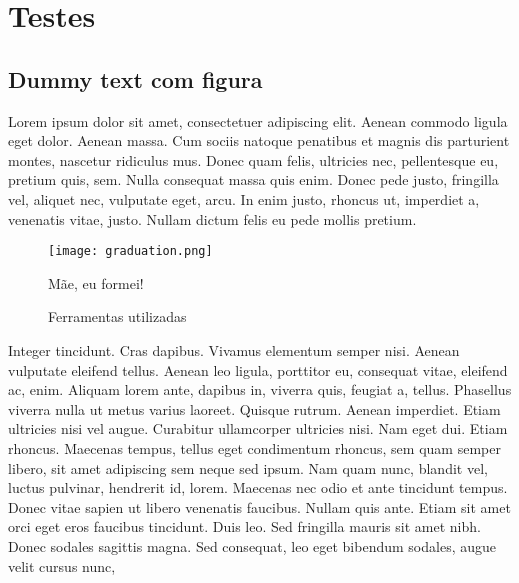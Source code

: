 \chapter{Testes}  

\section{Dummy text com figura}

Lorem ipsum dolor sit amet, consectetuer adipiscing elit. Aenean commodo ligula eget dolor. Aenean massa. Cum sociis natoque penatibus et magnis dis parturient montes, nascetur ridiculus mus. Donec quam felis, ultricies nec, pellentesque eu, pretium quis, sem. Nulla consequat massa quis enim. Donec pede justo, fringilla vel, aliquet nec, vulputate eget, arcu. In enim justo, rhoncus ut, imperdiet a, venenatis vitae, justo. Nullam dictum felis eu pede mollis pretium.

\begin{figure}[ht]
  
  \caption{Mãe, eu formei!}
  \centering
  \texttt{[image: graduation.png]}
  
\end{figure}

\begin{figure}[ht]
  
  \caption{Ferramentas utilizadas}
  \centering
  \hfill
  \hfill
  
\end{figure}

Integer tincidunt. Cras dapibus. Vivamus elementum semper nisi. Aenean vulputate eleifend tellus. Aenean leo ligula, porttitor eu, consequat vitae, eleifend ac, enim. Aliquam lorem ante, dapibus in, viverra quis, feugiat a, tellus. Phasellus viverra nulla ut metus varius laoreet. Quisque rutrum. Aenean imperdiet. Etiam ultricies nisi vel augue. Curabitur ullamcorper ultricies nisi. Nam eget dui. Etiam rhoncus. Maecenas tempus, tellus eget condimentum rhoncus, sem quam semper libero, sit amet adipiscing sem neque sed ipsum. Nam quam nunc, blandit vel, luctus pulvinar, hendrerit id, lorem. Maecenas nec odio et ante tincidunt tempus. Donec vitae sapien ut libero venenatis faucibus. Nullam quis ante. Etiam sit amet orci eget eros faucibus tincidunt. Duis leo. Sed fringilla mauris sit amet nibh. Donec sodales sagittis magna. Sed consequat, leo eget bibendum sodales, augue velit cursus nunc,

